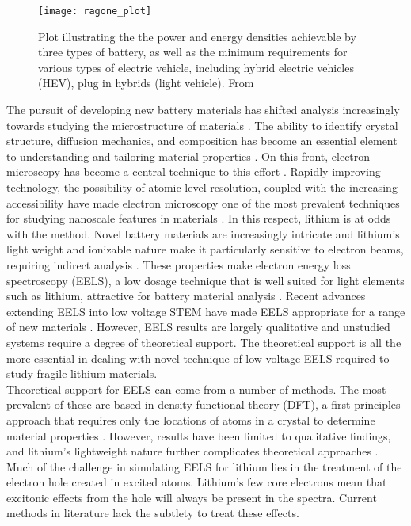 \begin{figure}
	\centering
	\texttt{[image: ragone\_plot]}
	\caption{Plot illustrating the the power and energy densities achievable by three types of battery, as well as the minimum requirements for various types of electric vehicle, including hybrid electric vehicles (HEV), plug in hybrids (light vehicle). From \cite{etacheri_challenges_2011} }
	\label{ragone}
	
\end{figure}
The pursuit of developing new battery materials has shifted analysis increasingly towards studying the microstructure of materials \cite{lu_lithium_2012,arthur_spontaneous_2016, muller_quantification_2018}. The ability to identify crystal structure, diffusion mechanics, and composition has become an essential element to understanding and tailoring material properties \cite{van_der_ven_first-principles_2001}.  On this front, electron microscopy has become a central technique to this effort  \cite{chiu_aqueous_2013,inkson_2_2016}.  Rapidly improving technology, the possibility of atomic level resolution, coupled with the increasing accessibility have made electron microscopy one of the most prevalent techniques for studying nanoscale features in materials \cite{hansen_atomic-resolution_2001}.  In this respect, lithium is at odds with the method.  Novel battery materials are increasingly intricate and lithium's light weight and ionizable nature make it particularly sensitive to electron beams, requiring indirect analysis \cite{kobayashi_quantitative_2017}.  These properties make electron energy loss spectroscopy (EELS), a low dosage technique that is well suited for light elements such as lithium, attractive for battery material analysis  \cite{Egerton}. Recent advances extending EELS into low voltage STEM have made EELS appropriate for a range of new materials \cite{SU_9000}.  However, EELS results are largely qualitative and unstudied systems require a degree of theoretical support.  The theoretical support is all the more essential in dealing with novel technique of low voltage EELS required to study fragile lithium materials.    
\\
Theoretical support for EELS can come from a number of methods. The most prevalent of these are based in density functional theory (DFT), a first principles approach that requires only the locations of atoms in a crystal to determine material properties \cite{ks_1965, wien2k,elk,exciting, vasp}.  However, results have been limited to qualitative findings, and lithium's lightweight nature further complicates theoretical approaches \cite{mauchamp_ab_2006, mauchamp_local_2008}. Much of the challenge in simulating EELS for lithium lies in the treatment of the electron hole created in excited atoms.  Lithium's few core electrons mean that excitonic effects from the hole will always be present in the spectra.  Current methods in literature lack the subtlety to treat these effects. 

